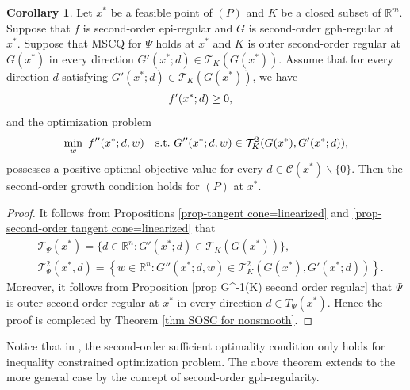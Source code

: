 \documentclass[11pt]{article}
\theoremstyle{definition}
\newtheorem{corollary}[theorem]{Corollary}
\theoremstyle{remark}
\numberwithin{equation}{section}
\begin{document}
\begin{corollary}\label{cor SOSC for
nonsmooth}
Let $x^*$ be a feasible point of $(P)$ and $K$ be a closed subset of $\mathbb{R}^m$. Suppose that $f$ is
    second-order
 epi-regular  and $G$ is
   second-order gph-regular at $x^*$.
   Suppose
  that MSCQ for $\Psi$ holds at $x^*$ and $K$ is outer second-order regular at $G(x^*)$ in every direction
  $G'(x^*;d)\in \mathcal{T}_{K}(G(x^*))$.
 Assume that for every direction $d$ satisfying $G'(x^*;d)\in \mathcal{T}_{K}(G(x^*))$, we have
 \begin{align}%
   & f'(x^*;d)\ge 0,\notag
 \end{align} and  the optimization problem
   \begin{align}%
    \min_{w}~ f''(x^*;d,w) ~~~{\rm s.t.}~G''(x^*;d,w)\in \mathcal{T}_{K}^2(G(x^*),G'(x^*;d)),\notag
   \end{align}
possesses a positive optimal objective value for every $d\in \mathcal{C}(x^*)\backslash \{0\}$. Then the
second-order growth condition holds for $(P)$ at $x^*$.
 \end{corollary}
\begin{proof}
It follows from Propositions \ref{prop-tangent cone=linearized} and \ref{prop-second-order tangent cone=linearized} that
\begin{align*}
   &\mathcal{T}_{\Psi}(x^*)=\{d\in \mathbb{R}^n:G'(x^*;d)\in \mathcal{T}_{K}(G(x^*))\},\\
  &\mathcal{T}^2_{\Psi}(x^*,d)=\left\{w\in \mathbb{R}^n:G''(x^*;d,w)\in
   \mathcal{T}_{K}^2(G(x^*),G'(x^*;d))\right\}.
  \end{align*}
Moreover, it follows from Proposition \ref{prop G^-1(K) second order regular} that $\Psi$ is outer second-order regular
at $x^*$ in every direction $d\in T_{\Psi}(x^*)$. Hence the proof is completed by Theorem \ref{thm SOSC for nonsmooth}.
\end{proof}

Notice that in \cite[Theorem 4.1]{Ruckmann}, the second-order sufficient optimality condition only holds for
inequality constrained optimization problem. The above theorem extends to the more general case by the concept of second-order gph-regularity.
\end{document}
